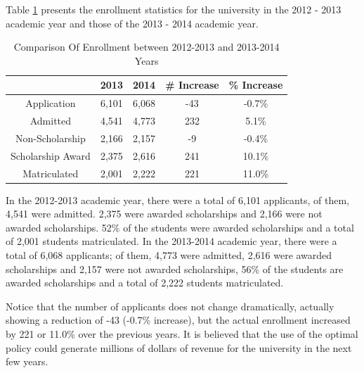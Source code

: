 \documentclass[12pt,english]{report}
\begin{document}
Table \ref{enroll_stats} presents the enrollment statistics for the university in the 2012 - 2013 academic year and those of the 2013 - 2014 academic year.

\begin{table}[H]
\centering
\begin{tabular}{|c|c|c|c|c|}
\hline
& 2013 & 2014 & \# Increase & \% Increase \\ \hline
Application                    & 6,101 & 6,068 & -43         & -0.7\%      \\ \hline
Admitted                       & 4,541 & 4,773 & 232         & 5.1\%       \\ \hline
Non-Scholarship                & 2,166 & 2,157 & -9          & -0.4\%      \\ \hline
Scholarship Award              & 2,375 & 2,616 & 241         & 10.1\%      \\ \hline
Matriculated                   & 2,001 & 2,222 & 221         & 11.0\%      \\ \hline
\end{tabular}
\caption{ Comparison Of Enrollment between 2012-2013 and 2013-2014 Years}
\label{enroll_stats}
\end{table}

In the 2012-2013 academic year, there were a total of 6,101 applicants, of them, 4,541 were admitted. 2,375 were awarded scholarships and 2,166 were not awarded scholarships. 52\% of the students were awarded scholarships and a total of 2,001 students matriculated. In the 2013-2014 academic year, there were a total of 6,068 applicants; of them, 4,773 were admitted, 2,616 were awarded scholarships and 2,157 were not awarded scholarships, 56\% of the students are awarded scholarships and a total of 2,222 students matriculated.

Notice that the number of applicants does not change dramatically, actually showing a reduction of -43 (-0.7\% increase), but the actual enrollment increased by 221  or 11.0\% over the previous years.  It is believed that the use of the optimal policy could generate millions of dollars of revenue for the university in the next few years.
\end{document}
